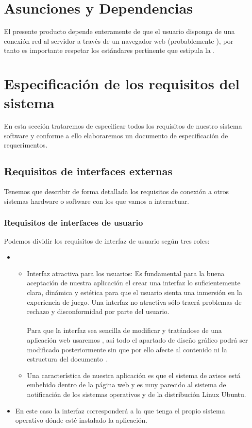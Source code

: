 \section{Asunciones y Dependencias}
El presente producto depende enteramente de que el usuario disponga de una
conexión red al servidor a través de un navegador web (probablemente
), por tanto es importante respetar los estándares pertinente
que estipula la .

\section{Especificación de los requisitos del sistema}
En esta sección trataremos de especificar todos los requisitos de nuestro
sistema software y conforme a ello elaboraremos un documento de especificación
de requerimentos.
\subsection{Requisitos de interfaces externas}
Tenemos que describir de forma detallada los requisitos de conexión a otros
sistemas hardware o software con los que vamos a interactuar.
\subsubsection{Requisitos de interfaces de usuario}
Podemos dividir los requisitos de interfaz de usuario según tres roles:

\begin{itemize}
\item {}
  \begin{itemize}
  \item Interfaz atractiva para los usuarios: Es fundamental para la buena
    aceptación de nuestra aplicación el crear una interfaz lo suficientemente
    clara, dinámica y estética para que el usuario sienta una inmersión en la
    experiencia de juego. Una interfaz no atractiva sólo traerá problemas de
    rechazo y disconformidad por parte del usuario.\\\\
    Para que la interfaz sea sencilla de modificar y tratándose de una
    aplicación web usaremos , así todo el apartado
    de diseño gráfico podrá ser modificado posteriormente sin que por ello
    afecte al contenido ni la estructura del documento .
  \item Una característica de nuestra aplicación es que el sistema de avisos
    está embebido dentro de la página web y es muy parecido al sistema de
    notificación de los sistemas operativos  y de la \cursiva
    {distribución Linux Ubuntu}.
  \end{itemize}
\item {} En este caso la interfaz corresponderá a la que
  tenga el propio sistema operativo dónde esté instalado la aplicación.
\end{itemize}


